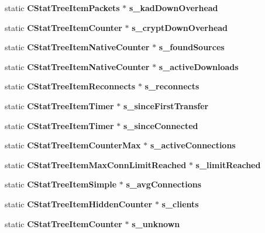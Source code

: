\begin{DoxyCompactItemize}
\item 
static {\bf CStatTreeItemPackets} $\ast$ {\bfseries s\_\-kadDownOverhead}\label{classCStatistics_acb52d9bbdd86e4045c622e2feb2eae64}

\item 
static {\bf CStatTreeItemCounter} $\ast$ {\bfseries s\_\-cryptDownOverhead}\label{classCStatistics_a2130e105819ce0d33b287b84e6842fdb}

\item 
static {\bf CStatTreeItemNativeCounter} $\ast$ {\bfseries s\_\-foundSources}\label{classCStatistics_a7a75c98cbadede696e131b1895e1254f}

\item 
static {\bf CStatTreeItemNativeCounter} $\ast$ {\bfseries s\_\-activeDownloads}\label{classCStatistics_af0925cbeef50661f55f395ee12ba5f85}

\item 
static {\bf CStatTreeItemReconnects} $\ast$ {\bfseries s\_\-reconnects}\label{classCStatistics_a756b7999abee7c6b52e66836ad42be7c}

\item 
static {\bf CStatTreeItemTimer} $\ast$ {\bfseries s\_\-sinceFirstTransfer}\label{classCStatistics_ab6d4b94745de26ab58afe9a657b48e1b}

\item 
static {\bf CStatTreeItemTimer} $\ast$ {\bfseries s\_\-sinceConnected}\label{classCStatistics_a81b89fefb4108e7a69996ecd75680c02}

\item 
static {\bf CStatTreeItemCounterMax} $\ast$ {\bfseries s\_\-activeConnections}\label{classCStatistics_a4a92855c8166735be2cda68f8a28ef7c}

\item 
static {\bf CStatTreeItemMaxConnLimitReached} $\ast$ {\bfseries s\_\-limitReached}\label{classCStatistics_abad74bfd2e8a5df939b4338cd46c404e}

\item 
static {\bf CStatTreeItemSimple} $\ast$ {\bfseries s\_\-avgConnections}\label{classCStatistics_acfcca51186714f2bc86bf762625f9e66}

\item 
static {\bf CStatTreeItemHiddenCounter} $\ast$ {\bfseries s\_\-clients}\label{classCStatistics_a01145b231232932a2116f8f47a690fdc}

\item 
static {\bf CStatTreeItemCounter} $\ast$ {\bfseries s\_\-unknown}\label{classCStatistics_afb3d0903fa44d86b77ce10bdd1b246ed}


\end{DoxyCompactItemize}
